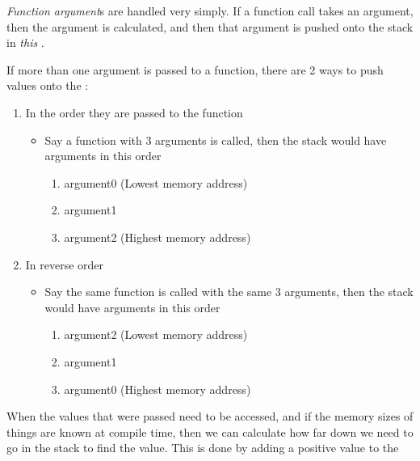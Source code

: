 \begin{definition}\label{def:Function_Argument}
  \emph{Function argument}s are handled very simply.
  If a function call takes an argument, then the argument is calculated, and then that argument is pushed onto the stack in \emph{this} .

  \begin{remark}
    If more than one argument is passed to a function, there are 2 ways to push values onto the :
    \begin{enumerate}[noitemsep]
    \item In the order they are passed to the function
      \begin{itemize}[noitemsep]
      \item Say a function with 3 arguments is called, then the stack would have arguments in this order
        \begin{enumerate}[noitemsep]
        \item argument0 (Lowest memory address)
        \item argument1
        \item argument2 (Highest memory address)
        \end{enumerate}
      \end{itemize}
    \item In reverse order
      \begin{itemize}[noitemsep]
      \item Say the same function is called with the same 3 arguments, then the stack would have arguments in this order
        \begin{enumerate}[noitemsep]
        \item argument2 (Lowest memory address)
        \item argument1
        \item argument0 (Highest memory address)
        \end{enumerate}
      \end{itemize}
    \end{enumerate}
  \end{remark}

  When the values that were passed need to be accessed, and if the memory sizes of things are known at compile time, then we can calculate how far down we need to go in the stack to find the value.
  This is done by adding a positive value to the \rbp{}
\end{definition}

